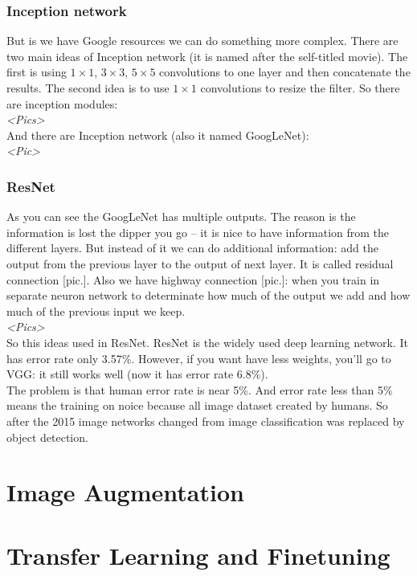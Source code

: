 \subsubsection*{Inception network}

But is we have Google resources we can do something more complex. There are two main ideas of Inception network (it is named after the self-titled movie). The first is using $1\times1$, $3\times3$, $5\times5$ convolutions to one layer and then concatenate the results. The second idea is to use $1\times1$ convolutions to resize the filter. So there are inception modules:\\
{\it <Pics>}\\
And there are Inception network (also it named GoogLeNet):\\
{\it <Pic>}

\subsubsection*{ResNet}

As you can see the GoogLeNet has multiple outputs. The reason is the information is lost the dipper you go -- it is nice to have information from the different layers. But instead of it we can do additional information: add the output from the previous layer to the output of next layer. It is called residual connection [pic.]. Also we have highway connection [pic.]: when you train in separate neuron network to determinate how much of the output we add and how much of the previous input we keep.\\
{\it <Pics>}\\
So this ideas used in ResNet. ResNet is the widely used deep learning network. It has error rate only 3.57\%. However, if you want have less weights, you'll go to VGG: it still works well (now it has error rate 6.8\%).\\
The problem is that human error rate is near 5\%. And error rate less than 5\% means the training on noice because all image dataset created by humans. So after the 2015 image networks changed from image classification was replaced by object detection.

\section{Image Augmentation}

\section{Transfer Learning and Finetuning}